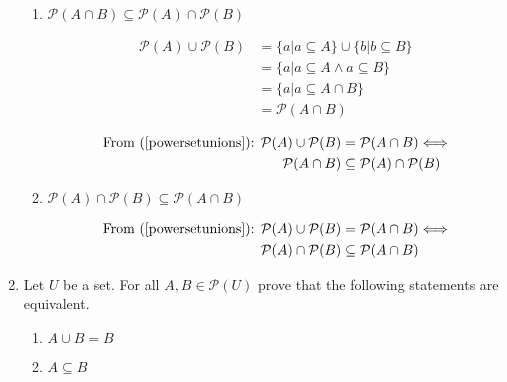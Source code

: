 \documentclass[10pt,\jkfside,a4paper]{article}
\begin{document}
\begin{enumerate}
\begin{enumerate}
\item $\mathcal{P}(A \cap B) \subseteq \mathcal{P}(A) \cap \mathcal{P}(B)$

\begin{equation}\label{powersetunions}
\begin{split}
\mathcal{P}(A) \cup \mathcal{P}(B) &= \{a | a \subseteq A \} \cup \{b | b \subseteq B\}\\
								   &= \{a | a \subseteq A \wedge a \subseteq B\}\\
								   &= \{a | a \subseteq A \cap B\}\\
								   &= \mathcal{P}(A \cap B)\\
\end{split}
\end{equation}
\begin{equation}
\begin{split}
\text{From (\ref{powersetunions}): } \mathcal{P}(A) \cup \mathcal{P}(B) &= \mathcal{P}(A \cap B) \Longleftrightarrow\\
\mathcal{P}(A \cap B) &\subseteq \mathcal{P}(A) \cap \mathcal{P}(B)\\
\end{split}
\end{equation}

\item $\mathcal{P}(A) \cap \mathcal{P}(B) \subseteq \mathcal{P}(A \cap B)$

\begin{equation}
\begin{split}
\text{From (\ref{powersetunions}): } \mathcal{P}(A) \cup \mathcal{P}(B) &= \mathcal{P}(A \cap B) \Longleftrightarrow\\
\mathcal{P}(A) \cap \mathcal{P}(B) &\subseteq \mathcal{P}(A \cap B)\\
\end{split}
\end{equation}

\end{enumerate}

\item Let $U$ be a set. For all $A, B \in \mathcal{P}(U)$ prove that the following statements are equivalent.

\begin{multicols}{4}

\begin{enumerate}

\item $A \cup B = B$

\item $A \subseteq B$


\end{enumerate}
\end{multicols}
\end{enumerate}
\end{document}
